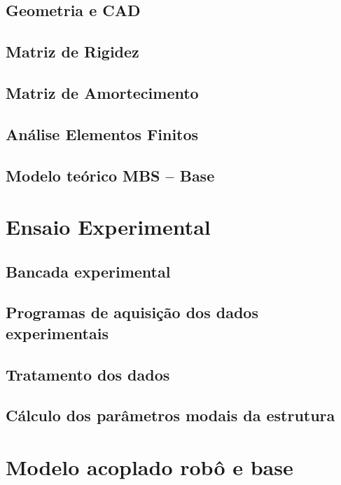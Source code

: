 \subsection{Geometria e CAD}

\subsection{Matriz de Rigidez}

\subsection{Matriz de Amortecimento}

\subsection{Análise Elementos Finitos}

\subsection{Modelo teórico MBS -- Base}


\section{Ensaio Experimental}

\subsection{Bancada experimental}

\subsection{Programas de aquisição dos dados experimentais}

\subsection{Tratamento dos dados}

\subsection{Cálculo dos parâmetros modais da estrutura}


\section{Modelo acoplado robô e base}

